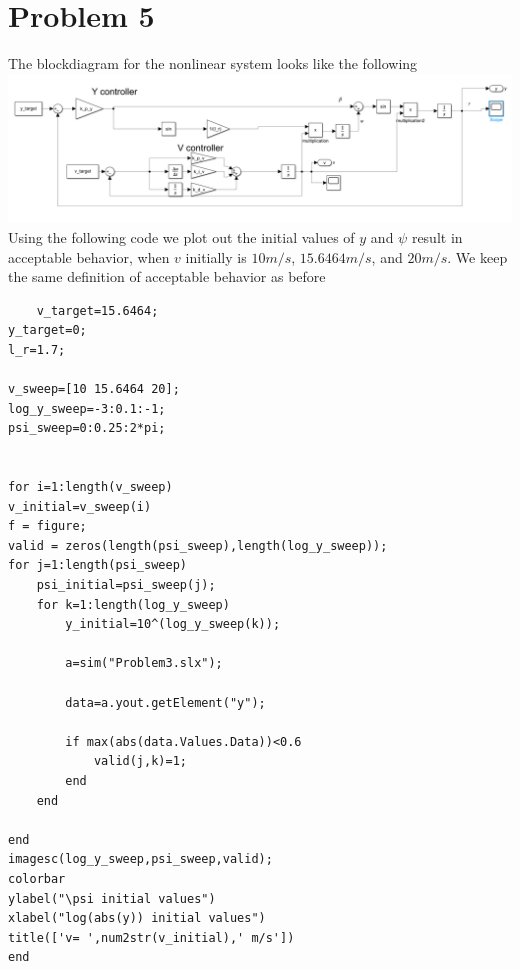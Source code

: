 \documentclass[12pt]{article}
\begin{document}
\section*{Problem 5}
The blockdiagram for the nonlinear system looks like the following\\
\includegraphics[scale=0.4]{Problem5BlockDiagram.PNG}\\
Using the following code we plot out the initial values of $y$ and $\psi$ result in acceptable behavior, when $v$ initially is $10m/s$, $15.6464m/s$, and $20m/s$.
We keep the same definition of acceptable behavior as before
\begin{verbatim}
    v_target=15.6464;
y_target=0;
l_r=1.7;

v_sweep=[10 15.6464 20];
log_y_sweep=-3:0.1:-1;
psi_sweep=0:0.25:2*pi;


for i=1:length(v_sweep)
v_initial=v_sweep(i)
f = figure;
valid = zeros(length(psi_sweep),length(log_y_sweep));
for j=1:length(psi_sweep)
    psi_initial=psi_sweep(j);
    for k=1:length(log_y_sweep)
        y_initial=10^(log_y_sweep(k));

        a=sim("Problem3.slx");

        data=a.yout.getElement("y");
    
        if max(abs(data.Values.Data))<0.6
            valid(j,k)=1;
        end
    end

end
imagesc(log_y_sweep,psi_sweep,valid);
colorbar
ylabel("\psi initial values")
xlabel("log(abs(y)) initial values")
title(['v= ',num2str(v_initial),' m/s'])
end
\end{verbatim}
\end{document}
